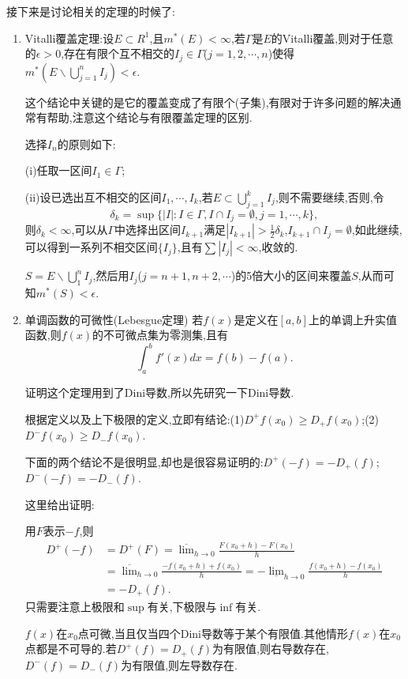 \documentclass[12pt,a4paper,openany]{book}
\begin{document}
接下来是讨论相关的定理的时候了:
\begin{enumerate}
\item Vitalli覆盖定理:设$E \subset R^1$,且$m^*(E)<\infty$,若$\Gamma$是$E$的Vitalli覆盖,则对于任意的$\epsilon>0$,存在有限个互不相交的$I_j \in \Gamma$($j=1,2,\cdots,n$)使得$m^*(E \backslash \bigcup_{j=1}^{n}{I_j}) < \epsilon$.

这个结论中关键的是它的覆盖变成了有限个(子集),有限对于许多问题的解决通常有帮助,注意这个结论与有限覆盖定理的区别.

选择$I_n$的原则如下:

(i)任取一区间$I_1 \in \Gamma$;

(ii)设已选出互不相交的区间$I_1,\cdots, I_k$,若$E \subset \bigcup_{j=1}^{k}{I_j}$,则不需要继续,否则,令
\[
\delta_k = \sup\{|I|:I \in \Gamma, I \cap I_j = \emptyset,j=1,\cdots,k\},
\]
则$\delta_k < \infty$,可以从$\Gamma$中选择出区间$I_{k+1}$满足$|I_{k+1}|>\frac{1}{2}\delta_k$,$I_{k+1} \cap I_j = \emptyset$,如此继续,可以得到一系列不相交区间$\{I_j\}$,且有$\sum|I_j|<\infty$,收敛的.

$S = E \backslash \bigcup_{1}^{n}{I_j}$,然后用$I_j$($j=n+1,n+2,\cdots$)的5倍大小的区间来覆盖$S$,从而可知$m^*(S)<\epsilon$.

\item 单调函数的可微性(Lebesgue定理) 若$f(x)$是定义在$[a,b]$上的单调上升实值函数,则$f(x)$的不可微点集为零测集,且有
\[
\int_{a}^{b}{f'(x)dx} = f(b) - f(a).
\]

证明这个定理用到了Dini导数,所以先研究一下Dini导数.

根据定义以及上下极限的定义,立即有结论:(1)$D^+f(x_0) \ge D_+f(x_0)$;(2)$D^-f(x_0) \ge D_-f(x_0)$.

下面的两个结论不是很明显,却也是很容易证明的:$D^+(-f) = -D_+(f)$;$D^-(-f) = -D_-(f)$.

这里给出证明:

用$F$表示$-f$,则
\[
\begin{aligned}
D^+(-f) &= D^+(F) = \overline{\lim}_{h \rightarrow 0}{\frac{F(x_0 + h) - F(x_0)}{h}} \\
&=\overline{\lim}_{h \rightarrow 0}{\frac{-f(x_0+h) + f(x_0)}{h}} = -\underline{\lim}_{h \rightarrow 0}{\frac{f(x_0 + h) - f(x_0)}{h}} \\
&=-D_+(f).
\end{aligned}
\]
只需要注意上极限和$\sup$有关,下极限与$\inf$有关.

$f(x)$在$x_0$点可微,当且仅当四个Dini导数等于某个有限值.其他情形$f(x)$在$x_0$点都是不可导的.若$D^+(f)=D_+(f)$为有限值,则右导数存在,$D^-(f)=D_-(f)$为有限值,则左导数存在.


\end{enumerate}
\end{document}

